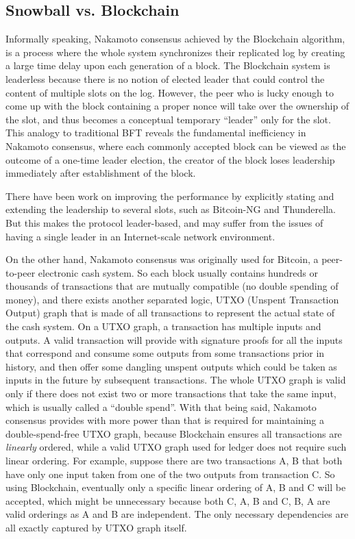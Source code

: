 \subsection{Snowball vs. Blockchain}
Informally speaking, Nakamoto consensus achieved by the Blockchain
algorithm, is a process where the whole system synchronizes their replicated
log by creating a large time delay upon each generation of a block. The
Blockchain system is leaderless because there is no notion of elected leader
that could control the content of multiple slots on the log. However, the peer who is lucky enough
to come up with the block containing a proper nonce will take over the
ownership of the slot, and thus becomes a conceptual temporary ``leader''
only for the slot.  This analogy to traditional BFT reveals the
fundamental inefficiency in Nakamoto consensus, where each commonly accepted
block can be viewed as the outcome of a one-time leader election, the creator
of the block loses leadership immediately after establishment of the block.

There have been work on improving the performance by explicitly stating and
extending the leadership to several slots, such as Bitcoin-NG and Thunderella.
But this makes the protocol leader-based, and may suffer from the issues of
having a single leader in an Internet-scale network environment.

On the other hand, Nakamoto consensus was originally used for Bitcoin, a
peer-to-peer electronic cash system. So each block usually contains hundreds or
thousands of transactions that are mutually compatible (no double spending of
money), and there exists another separated logic, UTXO (Unspent Transaction
Output) graph that is made of all transactions to represent the actual state of
the cash system. On a UTXO graph, a transaction has multiple inputs and
outputs. A valid transaction will provide with signature proofs for all the
inputs that correspond and consume some outputs from some transactions prior in
history, and then offer some dangling unspent outputs which could be taken as
inputs in the future by subsequent transactions. The whole UTXO graph is valid
only if there does not exist two or more transactions that take the same input,
which is usually called a ``double spend''. With that being said,
Nakamoto consensus provides with more power than that is required for
maintaining a double-spend-free UTXO graph, because Blockchain ensures all transactions are
\emph{linearly} ordered, while a valid UTXO graph used for ledger does not
require such linear ordering. For example, suppose there are two transactions
A, B that both have only one input taken from one of the two outputs from
transaction C. So using Blockchain, eventually only a specific linear ordering
of A, B and C will be accepted, which might be unnecessary because both C, A, B
and C, B, A are valid orderings as A and B are independent. The only
necessary dependencies are all exactly captured by UTXO graph itself.


